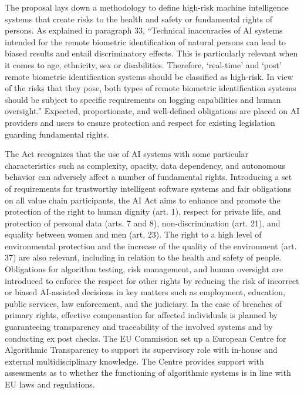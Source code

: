 The proposal lays down a methodology to define high-risk machine intelligence systems that create risks to the health and safety or fundamental rights of persons. As explained in paragraph 33, ``Technical inaccuracies of AI systems\vadjust{\vfill\pagebreak} intended for the remote biometric identification of natural persons can lead to biased results and entail discriminatory effects. This is particularly relevant when it comes to age, ethnicity, sex or disabilities. Therefore, `real-time' and `post' remote \hbox{biometric} identification systems should be classified as high-risk. In view of the risks that they pose, both types of remote biometric identification systems should be subject to specific requirements on logging capabilities and human oversight.'' Expected, proportionate, and well-defined obligations are placed on AI providers and users to ensure protection and respect for existing legislation guarding fundamental rights.

The Act recognizes that the use of AI systems with some particular characteristics such as complexity, opacity, data dependency, and autonomous behavior can adversely affect a number of fundamental rights. Introducing a set of requirements for trustworthy intelligent software systems and fair obligations on all value chain participants, the AI Act aims to enhance and promote the protection of the right to human dignity (art. 1), respect for private life, and protection of personal data (arts. 7 and 8), non-discrimination (art. 21), and equality between women and men (art. 23). The right to a high level of environmental protection and the increase of the quality of the environment (art. 37) are also relevant, including in relation to the health and safety of people. Obligations for algorithm testing, risk management, and human oversight are introduced to enforce the respect for other rights by reducing the risk of incorrect or biased AI-assisted decisions in key matters such as employment, education, public services, law enforcement, and the judiciary. In the case of breaches of primary rights, effective compensation for affected individuals is planned by guaranteeing transparency and traceability of the involved systems and by conducting ex post checks. The EU Commission set up a European \hbox{Centre} for Algorithmic Transparency to support its supervisory role with in-house and external multidisciplinary knowledge. The Centre provides support with assessments as to whether the functioning of algorithmic systems is in line with EU laws and regulations.

